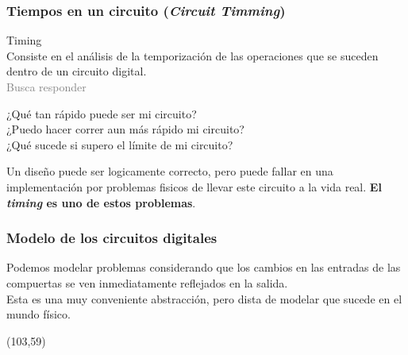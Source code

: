 \documentclass[aspectratio=169]{beamer}
\begin{document}
\begin{frame}[fragile]
    \frametitle{Tiempos en un circuito (\emph{Circuit Timming})}
    \textcolor{naranjauca}{Timing}\\
    Consiste en el análisis de la temporización de las operaciones que se suceden dentro de un circuito digital.\\
    \bigskip
    \pause
    \textcolor{gray}{Busca responder}\\
    \begin{center}
    ¿Qué tan rápido puede ser mi circuito?\\
    \pause
    ¿Puedo hacer correr aun más rápido mi circuito?\\
    \pause
    ¿Qué sucede si supero el límite de mi circuito?\\
    \pause
    \end{center}
    \bigskip
    \textcolor{verdeuca}{Un diseño puede ser logicamente correcto, pero puede fallar en una implementación por problemas fisicos de llevar este circuito a la vida real.
    \textbf{El \emph{timing} es uno de estos problemas}.}
\end{frame}

\begin{frame}[fragile,t]
    \frametitle{Modelo de los circuitos digitales}
    Podemos modelar problemas considerando que los cambios en las entradas de las compuertas se ven inmediatamente reflejados en la salida.\\
    \textcolor{verdeuca}{Esta es una muy conveniente abstracción, pero dista de modelar que sucede en el mundo físico.}\\
    \bigskip
    \begin{textblock}{45}(103,59)
    \end{textblock}
\end{frame}
\end{document}
